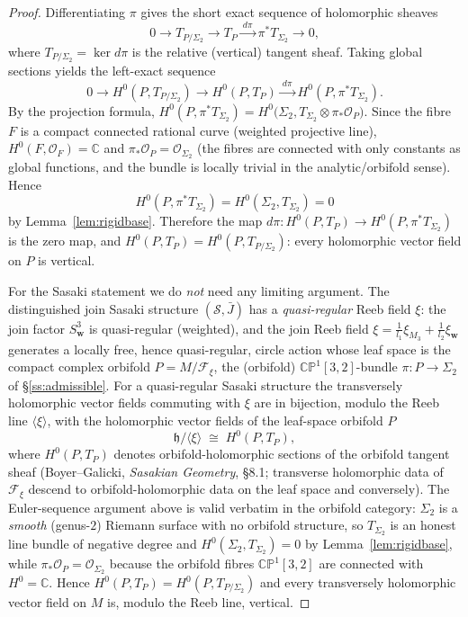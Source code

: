 \documentclass{amsart}
\theoremstyle{definition}
\begin{document}
\begin{proof}
Differentiating $\pi$ gives the short exact sequence of holomorphic sheaves
\[
  0 \longrightarrow T_{P/\Sigma_2} \longrightarrow T_P
  \xrightarrow{\ d\pi\ } \pi^*T_{\Sigma_2} \longrightarrow 0 ,
\]
where $T_{P/\Sigma_2}=\ker d\pi$ is the relative (vertical) tangent sheaf. Taking
global sections yields the left-exact sequence
\[
  0 \to H^0(P,T_{P/\Sigma_2}) \to H^0(P,T_P)
  \xrightarrow{\ d\pi\ } H^0(P,\pi^*T_{\Sigma_2}).
\]
By the projection formula,
$H^0(P,\pi^*T_{\Sigma_2})=H^0\!\bigl(\Sigma_2,T_{\Sigma_2}\otimes
\pi_*\mathcal O_P\bigr)$. Since the fibre $F$ is a compact connected rational
curve (weighted projective line), $H^0(F,\mathcal O_F)=\mathbb C$ and
$\pi_*\mathcal O_P=\mathcal O_{\Sigma_2}$ (the fibres are connected with only
constants as global functions, and the bundle is locally trivial in the
analytic/orbifold sense). Hence
\[
  H^0(P,\pi^*T_{\Sigma_2})=H^0(\Sigma_2,T_{\Sigma_2})=0
\]
by Lemma~\ref{lem:rigidbase}. Therefore the map
$d\pi\colon H^0(P,T_P)\to H^0(P,\pi^*T_{\Sigma_2})$ is the zero map, and
$H^0(P,T_P)=H^0(P,T_{P/\Sigma_2})$: every holomorphic vector field on $P$ is
vertical.

For the Sasaki statement we do \emph{not} need any limiting argument. The
distinguished join Sasaki structure $(\mathcal S,\bar J)$ has a
\emph{quasi-regular} Reeb field $\xi$: the join factor $S^3_{\mathbf w}$ is
quasi-regular (weighted), and the join Reeb field $\xi=\frac1{l_1}\xi_{M_3}+
\frac1{l_2}\xi_{\mathbf w}$ generates a locally free, hence quasi-regular,
circle action whose leaf space is the compact complex orbifold
$P=M/\mathcal F_\xi$, the (orbifold) $\mathbb{CP}^1[3,2]$-bundle
$\pi\colon P\to\Sigma_2$ of \S\ref{ss:admissible}. For a quasi-regular
Sasaki structure the transversely holomorphic vector fields commuting with $\xi$
are in bijection, modulo the Reeb line $\langle\xi\rangle$, with the
holomorphic vector fields of the leaf-space orbifold $P$
\[
  \mathfrak h \big/\langle\xi\rangle \;\cong\; H^0(P,T_P),
\]
where $H^0(P,T_P)$ denotes orbifold-holomorphic sections of the orbifold tangent
sheaf (Boyer--Galicki, \emph{Sasakian Geometry}, \S8.1; transverse holomorphic
data of $\mathcal F_\xi$ descend to orbifold-holomorphic data on the leaf space
and conversely). The Euler-sequence argument above is valid verbatim in the
orbifold category: $\Sigma_2$ is a \emph{smooth} (genus-$2$) Riemann surface
with no orbifold structure, so $T_{\Sigma_2}$ is an honest line bundle of
negative degree and $H^0(\Sigma_2,T_{\Sigma_2})=0$ by
Lemma~\ref{lem:rigidbase}, while $\pi_*\mathcal O_P=\mathcal O_{\Sigma_2}$
because the orbifold fibres $\mathbb{CP}^1[3,2]$ are connected with
$H^0=\mathbb C$. Hence $H^0(P,T_P)=H^0(P,T_{P/\Sigma_2})$ and every
transversely holomorphic vector field on $M$ is, modulo the Reeb line,
vertical.
\end{proof}
\end{document}

